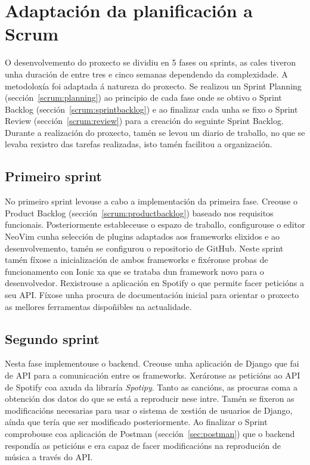 \section{Adaptación da planificación a Scrum}
O desenvolvemento do proxecto se dividiu en 5 fases ou sprints, as cales tiveron unha duración de entre tres e cinco semanas dependendo da complexidade. A metodoloxía foi adaptada á natureza do proxecto. Se realizou un Sprint Planning (sección~\ref{scrum:planning}) ao principio de cada fase onde se obtivo o Sprint Backlog (sección~\ref{scrum:sprintbacklog}) e ao finalizar cada unha se fixo o Sprint Review (sección~\ref{scrum:review}) para a creación do seguinte Sprint Backlog. Durante a realización do proxecto, tamén se levou un diario de traballo, no que se levaba rexistro das tarefas realizadas, isto tamén facilitou a organización.

\subsection{Primeiro sprint}
No primeiro sprint levouse a cabo a implementación da primeira fase. Creouse o Product Backlog (sección~\ref{scrum:productbacklog}) baseado nos requisitos funcionais. Posteriormente estableceuse o espazo de traballo, configurouse o editor NeoVim cunha selección de plugins adaptados aos frameworks elixidos e ao desenvolvemento, tamén se configurou o repositorio de GitHub. Neste sprint tamén fíxose a inicialización de ambos frameworks e fixéronse probas de funcionamento con Ionic xa que se trataba dun framework novo para o desenvolvedor. Rexistrouse a aplicación en Spotify o que permite facer peticións a seu API. Fíxose unha procura de documentación inicial para orientar o proxecto as mellores ferramentas dispoñibles na actualidade.

\subsection{Segundo sprint}
Nesta fase implementouse o backend. Creouse unha aplicación de Django que fai de API para a comunicación entre os frameworks. Xeráronse as peticións ao API de Spotify coa axuda da libraría \textit{Spotipy}. Tanto as cancións, as procuras coma a obtención dos datos do que se está a reproducir nese intre. Tamén se fixeron as modificacións necesarias para usar o sistema de xestión de usuarios de Django, aínda que tería que ser modificado posteriormente.\smallbreak
Ao finalizar o Sprint comprobouse coa aplicación de Postman (sección~\ref{sec:postman}) que o backend respondía as peticións e era capaz de facer modificacións na reprodución de música a través do API.

